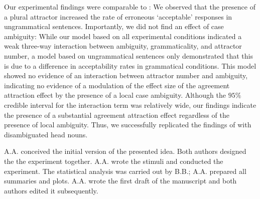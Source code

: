 \documentclass[apacite,linguex]{glossa}\usepackage[]{graphicx}\usepackage[]{color}
\newcommand{\firstauthor}{{A.A.}}
\newcommand{\secondauthor}{{B.B.}}
\begin{document}
Our experimental findings were comparable to \citet{LagoEtAl:2019}: We observed that the presence of a plural attractor increased the rate of erroneous `acceptable' responses  
in ungrammatical sentences.
Importantly, we did not find an effect of case ambiguity: While our model based on all experimental conditions indicated a weak three-way interaction between ambiguity, grammaticality, and attractor number, a model based on ungrammatical sentences only demonstrated that this is due to a difference in acceptability rates in grammatical conditions. This model showed no evidence of an interaction between attractor number and ambiguity, indicating no evidence of a modulation of the effect size of the agreement attraction effect by the presence of a local case ambiguity. 
Although the $95\%$ credible interval for the interaction term was relatively wide, our findings indicate the presence of a substantial agreement attraction effect regardless of the presence of local ambiguity.
Thus, we successfully replicated the findings of \citet{LagoEtAl:2019} with disambiguated head nouns. 












{\firstauthor} conceived the initial version of the presented idea. Both authors designed the the experiment together. 
{\firstauthor} wrote the stimuli and conducted the experiment. The statistical analysis was carried out by {\secondauthor}; {\firstauthor} prepared all summaries and plots. {\firstauthor} wrote the first draft of the manuscript and both authors edited it subsequently. 




\end{document}
